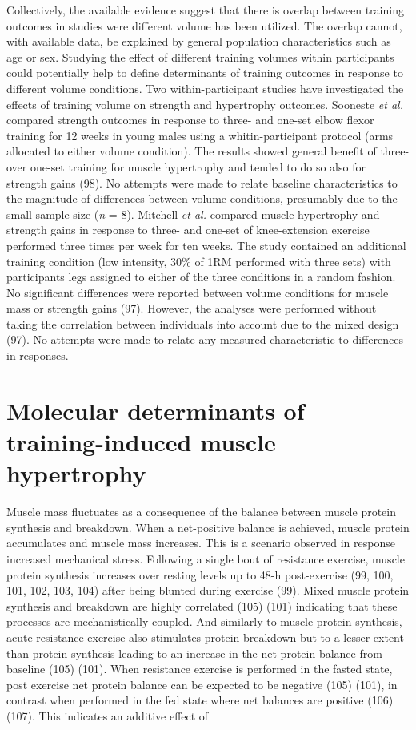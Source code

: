 \documentclass[twoside,10pt]{gihclass} %
\begin{document}
Collectively, the available evidence suggest that there is overlap between training outcomes in studies were different volume has been utilized.
The overlap cannot, with available data, be explained by general population characteristics such as age or sex.
Studying the effect of different training volumes within participants could potentially help to define determinants of training outcomes in response to different volume conditions.
Two within-participant studies have investigated the effects of training volume on strength and hypertrophy outcomes.
Sooneste \emph{et al.} compared strength outcomes in response to three- and one-set elbow flexor training for 12 weeks in young males using a whitin-participant protocol (arms allocated to either volume condition).
The results showed general benefit of three- over one-set training for muscle hypertrophy and tended to do so also for strength gains (98).
No attempts were made to relate baseline characteristics to the magnitude of differences between volume conditions, presumably due to the small sample size (\emph{n} = 8).
Mitchell \emph{et al.} compared muscle hypertrophy and strength gains in response to three- and one-set of knee-extension exercise performed three times per week for ten weeks.
The study contained an additional training condition (low intensity, 30\% of 1RM performed with three sets) with participants legs assigned to either of the three conditions in a random fashion.
No significant differences were reported between volume conditions for muscle mass or strength gains (97).
However, the analyses were performed without taking the correlation between individuals into account due to the mixed design (97).
No attempts were made to relate any measured characteristic to differences in responses.

\hypertarget{molecular-determinants-of-training-induced-muscle-hypertrophy}{%
\section{Molecular determinants of training-induced muscle hypertrophy}\label{molecular-determinants-of-training-induced-muscle-hypertrophy}}

Muscle mass fluctuates as a consequence of the balance between muscle protein synthesis and breakdown. When a net-positive balance is achieved, muscle protein accumulates and muscle mass increases.
This is a scenario observed in response increased mechanical stress.
Following a single bout of resistance exercise, muscle protein synthesis increases
over resting levels up to 48-h post-exercise
(99, 100, 101, 102, 103, 104)
after being blunted during exercise
(99).
Mixed muscle protein synthesis and breakdown are highly correlated
(105)
(101)
indicating that these processes are mechanistically coupled.
And similarly to muscle protein synthesis, acute resistance exercise also stimulates protein breakdown but to a lesser extent than protein synthesis leading to an increase in the net protein balance from baseline
(105)
(101).
When resistance exercise is performed in the fasted state, post exercise net protein balance can be expected to be negative
(105)
(101),
in contrast when performed in the fed state where net balances are positive
(106)
(107).
This indicates an additive effect of
\end{document}
